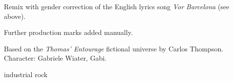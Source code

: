 

\begin{notes}
Remix with gender correction of the English lyrics song \emph{Vor Barcelona} (see above).

Further production marks added manually.

Based on the \emph{Thomas’ Entourage} fictional universe by Carlos Thompson.\\
Character: Gabriele Wiater, Gabi.
\end{notes}

\begin{style}
industrial rock
\end{style}

